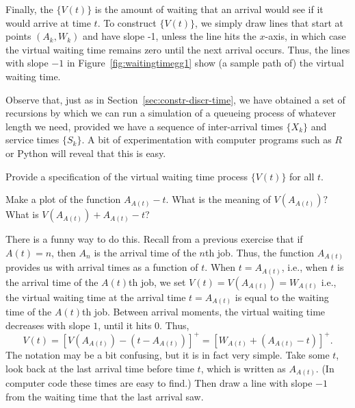 Finally, the  $\{V(t)\}$ is the
amount of waiting that an arrival would see if it would arrive at time
$t$. To construct $\{V(t)\}$, we simply draw lines that start at
points $(A_k, W_k)$ and have slope -1, unless the line hits the
$x$-axis, in which case the virtual waiting time remains zero until
the next arrival occurs.  Thus, the lines with slope $-1$ in
Figure~\ref{fig:waitingtimegg1} show (a sample path of) the virtual
waiting time.


Observe that, just as in Section~\ref{sec:constr-discr-time}, we have
obtained a set of recursions by which we can run a simulation of a
queueing process of whatever length we need, provided we have a
sequence of inter-arrival times $\{X_k\}$ and service times
$\{S_k\}$.  A bit of experimentation with computer programs such as
$R$ or Python will reveal that this is easy.





\begin{exercise}
  Provide a specification of the virtual waiting time process $\{V(t)\}$ for
    all $t$.
    \begin{hint}Make a plot of the function $A_{A(t)}-t$. What is the meaning of $V(A_{A(t)})?$ What is
$V(A_{A(t)}) + A_{A(t)}-t$?
    \end{hint}
    \begin{solution}
      There is a funny way to do this. Recall from a previous exercise
      that if $A(t)=n$, then $A_n$ is the arrival time of the $n$th
      job. Thus, the function $A_{A(t)}$ provides us with arrival
      times as a function of $t$. When $t=A_{A(t)}$, i.e., when $t$ is
      the arrival time of the $A(t)$th job, we set
      $V(t) = V(A_{A(t)}) = W_{A(t)}$ i.e., the virtual waiting time
      at the arrival time $t=A_{A(t)}$ is equal to the waiting time of
      the $A(t)$th job. Between arrival moments, the virtual waiting
      time decreases with slope $1$, until it hits 0.  Thus,
      \begin{equation*}
        V(t) 
= [V(A_{A(t)}) - (t-A_{A(t)})]^+= [W_{A(t)} + (A_{A(t)}-t)]^+.
      \end{equation*}
      The notation may be a bit confusing, but it is in fact very
      simple. Take some $t$, look back at the last arrival time before
      time $t$, which is written as $A_{A(t)}$. (In computer code these
      times are easy to find.) Then draw a line with slope $-1$ from
      the waiting time that the last arrival saw.
    \end{solution}
\end{exercise}





